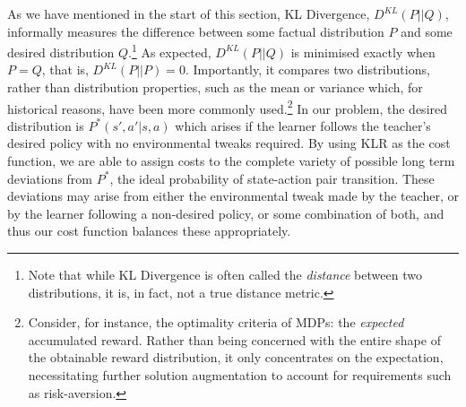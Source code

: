 As we have mentioned in the start of this section, KL Divergence,
$D^{KL}(P||Q)$, informally measures the difference between some
factual distribution $P$ and some desired distribution
$Q$.\footnote{Note that while KL Divergence is often called the
  \emph{distance} between two distributions, it is, in fact, not a
  true distance metric.}  As expected, $D^{KL}(P||Q)$ is minimised
exactly when $P=Q$, that is, $D^{KL}(P||P)=0$. Importantly, it
compares two distributions, rather than distribution properties, such
as the mean or variance which, for historical reasons, have been more
commonly used.\footnote{Consider, for instance, the optimality
  criteria of MDPs: the {\em expected} accumulated reward. Rather than
  being concerned with the entire shape of the obtainable reward
  distribution, it only concentrates on the expectation, necessitating
  further solution augmentation to account for requirements such as
  risk-aversion.}  In our problem, the desired distribution is
$P^*(s',a'|s,a)$ which arises if the learner follows the teacher's
desired policy with no environmental tweaks required.  By using KLR as
the cost function, we are able to assign costs to the complete variety
of possible long term deviations from $P^*$, the
ideal probability of state-action pair transition.  
These deviations
may arise from either the environmental tweak made by the teacher, or
by the learner following a non-desired policy, or some combination of
both, and thus our cost function balances these appropriately.





